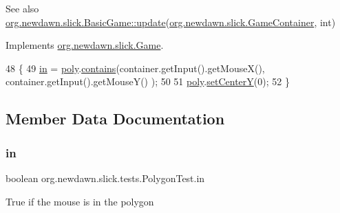 \begin{DoxySeeAlso}{See also}
\mbox{\hyperlink{classorg_1_1newdawn_1_1slick_1_1_basic_game_acfe6fa05aef83bff1631af91a3e4bd20}{org.\+newdawn.\+slick.\+Basic\+Game\+::update}}(\mbox{\hyperlink{classorg_1_1newdawn_1_1slick_1_1_game_container}{org.\+newdawn.\+slick.\+Game\+Container}}, int) 
\end{DoxySeeAlso}


Implements \mbox{\hyperlink{interfaceorg_1_1newdawn_1_1slick_1_1_game_ab07b2e9463ee4631620dde0de25bdee8}{org.\+newdawn.\+slick.\+Game}}.


\begin{DoxyCode}
48                                                                                  \{
49         \mbox{\hyperlink{classorg_1_1newdawn_1_1slick_1_1tests_1_1_polygon_test_ab090a6129c72d1e91c59185d568fb381}{in}} = \mbox{\hyperlink{classorg_1_1newdawn_1_1slick_1_1tests_1_1_polygon_test_a9208c4dd8be9ef4468e17c2d6f0fdff0}{poly}}.\mbox{\hyperlink{classorg_1_1newdawn_1_1slick_1_1geom_1_1_shape_ae9dcbe23fb1bcd01bac0ddcfe09685de}{contains}}(container.getInput().getMouseX(), container.getInput().getMouseY()
      );
50         
51         \mbox{\hyperlink{classorg_1_1newdawn_1_1slick_1_1tests_1_1_polygon_test_a9208c4dd8be9ef4468e17c2d6f0fdff0}{poly}}.\mbox{\hyperlink{classorg_1_1newdawn_1_1slick_1_1geom_1_1_shape_ad9ff9a26b4cb2799696bdc938965b2fc}{setCenterY}}(0);
52     \}
\end{DoxyCode}


\subsection{Member Data Documentation}
\mbox{\label{classorg_1_1newdawn_1_1slick_1_1tests_1_1_polygon_test_ab090a6129c72d1e91c59185d568fb381}} 
\subsubsection{\texorpdfstring{in}{in}}
{\footnotesize\ttfamily boolean org.\+newdawn.\+slick.\+tests.\+Polygon\+Test.\+in\hspace{0.3cm}{\ttfamily [private]}}

True if the mouse is in the polygon \mbox{\label{classorg_1_1newdawn_1_1slick_1_1tests_1_1_polygon_test_a9208c4dd8be9ef4468e17c2d6f0fdff0}} 
